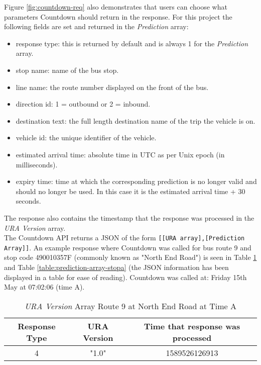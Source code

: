 Figure \ref{fig:countdown-req} also demonstrates that users can choose what parameters Countdown should return in the response. For this project the following fields are set and returned in the \textit{Prediction} array: 
\begin{itemize}
    \item response type: this is returned by default and is always 1 for the \textit{Prediction} array.
    \item stop name: name of the bus stop.
    \item line name: the route number displayed on the front of the bus.
    \item direction id: 1 = outbound or 2 = inbound.
    \item destination text: the full length destination name of the trip the vehicle is on.
    \item vehicle id: the unique identifier of the vehicle.
    \item estimated arrival time: absolute time in UTC as per Unix epoch (in milliseconds).
    \item expiry time: time at which the corresponding prediction is no longer valid and should no longer be used. In this case it is the estimated arrival time + 30 seconds. 
\end{itemize}
The response also contains the timestamp that the response was processed in the \textit{URA Version} array. \\

The Countdown API returns a JSON of the form \texttt{[[URA array],[Prediction Array]]}. An example response where Countdown was called for bus route 9 and stop code 490010357F (commonly known as "North End Road") is seen in Table \ref{table:ura-array-stopa} and Table \ref{table:prediction-array-stopa} (the JSON information has been displayed in a table for ease of reading). Countdown was called at: Friday 15th May at 07:02:06 (time A).

\begin{table}[H]
    \centering
    \begin{tabular}{|c|c|c|}
        \hline
          Response Type & URA Version & Time that response was processed \\
        \hline
           4  & "1.0" & 1589526126913 \\
        \hline
        \end{tabular}
    \caption{\textit{URA Version} Array Route 9 at North End Road at Time A}
    \label{table:ura-array-stopa}
\end{table}

